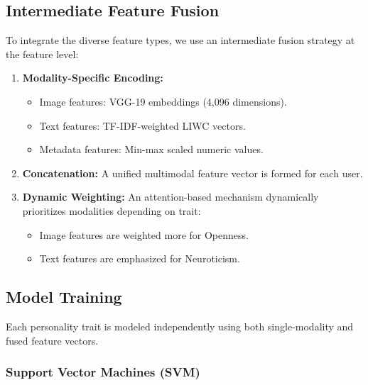 \subsection{Intermediate Feature Fusion}
\label{subsec:fusion}

To integrate the diverse feature types, we use an intermediate fusion strategy at the feature level:

\begin{enumerate}
	\item \textbf{Modality-Specific Encoding:}
	\begin{itemize}
		\item Image features: VGG-19 embeddings (4,096 dimensions).
		\item Text features: TF-IDF-weighted LIWC vectors.
		\item Metadata features: Min-max scaled numeric values.
	\end{itemize}
	
	\item \textbf{Concatenation:} A unified multimodal feature vector is formed for each user.
	
	\item \textbf{Dynamic Weighting:} An attention-based mechanism dynamically prioritizes modalities depending on trait:
	\begin{itemize}
		\item Image features are weighted more for Openness.
		\item Text features are emphasized for Neuroticism.
	\end{itemize}
\end{enumerate}

\subsection{Model Training}
\label{subsec:models}

Each personality trait is modeled independently using both single-modality and fused feature vectors.

\subsubsection{Support Vector Machines (SVM)}
\label{subsubsec:svm}

